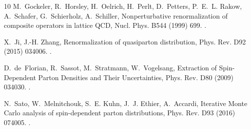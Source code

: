 \begin{thebibliography}{10}
M.~Gockeler, R.~Horsley, H.~Oelrich, H.~Perlt, D.~Petters, P.~E.~L. Rakow,
  A.~Schafer, G.~Schierholz, A.~Schiller, {Nonperturbative renormalization of
  composite operators in lattice QCD}, Nucl. Phys. B544 (1999) 699.
\newblock \href {http://arxiv.org/abs/hep-lat/9807044}
  {}.

X.~Ji, J.-H. Zhang, {Renormalization of quasiparton distribution}, Phys. Rev.
  D92 (2015) 034006.
\newblock \href {http://arxiv.org/abs/1505.07699} {}.

D.~de~Florian, R.~Sassot, M.~Stratmann, W.~Vogelsang, {Extraction of
  Spin-Dependent Parton Densities and Their Uncertainties}, Phys. Rev. D80
  (2009) 034030.
\newblock \href {http://arxiv.org/abs/0904.3821} {}.

N.~Sato, W.~Melnitchouk, S.~E. Kuhn, J.~J. Ethier, A.~Accardi, {Iterative Monte
  Carlo analysis of spin-dependent parton distributions}, Phys. Rev. D93 (2016)
  074005.
\newblock \href {http://arxiv.org/abs/1601.07782} {}.

\end{thebibliography}
